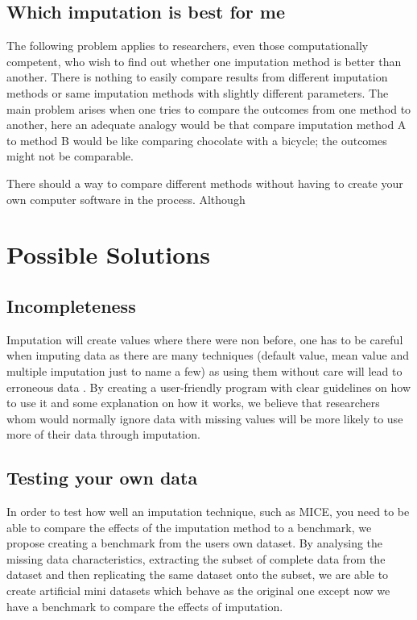 \documentclass{IEEEconf}
\begin{document}
		\subsection{Which imputation is best for me} %
		\label{sub:which_imputation_is_best_for_me}
			The following problem applies to researchers, even those computationally competent, who wish to find out whether one imputation method is better than another. There is nothing to easily compare results from different imputation methods or same imputation methods with slightly different parameters. The main problem arises when one tries to compare the outcomes from one method to another, here an adequate analogy would be that compare imputation method A to method B would be like comparing chocolate with a bicycle; the outcomes might not be comparable. 

			There should a way to compare different methods without having to create your own computer software in the process. Although 

	\section{Possible Solutions} %
	\label{sec:a_solution}
		\subsection{Incompleteness} %
		\label{sub:incompleteness}
			Imputation will create values where there were non before, one has to be careful when imputing data as there are many techniques (default value, mean value and multiple imputation just to name a few) as using them without care will lead to erroneous data \cite{careful}. By creating a user-friendly program with clear guidelines on how to use it and some explanation on how it works, we believe that researchers whom would normally ignore data with missing values will be more likely to use more of their data through imputation. 
		\subsection{Testing your own data} %
		\label{sub:testing_your_own_data}
			In order to test how well an imputation technique, such as MICE, you need to be able to compare the effects of the imputation method to a benchmark, we propose creating a benchmark from the users own dataset. By analysing the missing data characteristics, extracting the subset of complete data from the dataset and then replicating the same dataset onto the subset, we are able to create artificial mini datasets which behave as the original one except now we have a benchmark to compare the effects of imputation. 
\end{document}
